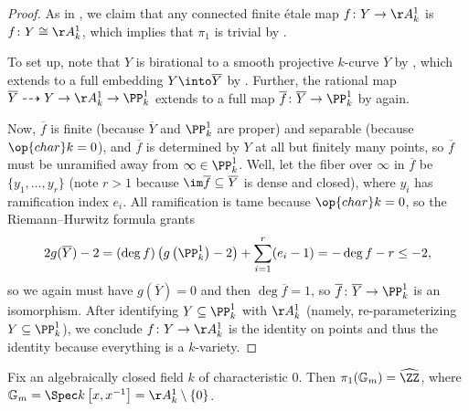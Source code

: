 \documentclass{amsart}
\begin{document}
\begin{proof}
    As in , we claim that any connected finite \'etale map $f\colon Y\to\AA^1_k$ is $f\colon Y\cong\AA^1_k$, which implies that $\pi_1$ is trivial by .

    To set up, note that $Y$ is birational to a smooth projective $k$-curve $\overline Y$ by \cite[Corollary~I.6.11]{hartshorne}, which extends to a full embedding $Y\into\overline Y$ by \cite[Proposition~I.6.8]{hartshorne}. Further, the rational map $\overline Y\dashrightarrow Y\to\AA^1_k\to\PP^1_k$ extends to a full map $\overline f\colon\overline Y\to\PP^1_k$ by \cite[Proposition~I.6.8]{hartshorne} again.

    Now, $\overline f$ is finite (because $\overline Y$ and $\PP^1_k$ are proper) and separable (because $\op{char}k=0$), and $\overline f$ is determined by $Y$ at all but finitely many points, so $\overline f$ must be unramified away from $\infty\in\PP^1_k$. Well, let the fiber over $\infty$ in $\overline f$ be $\{y_1,\ldots,y_r\}$ (note $r>1$ because $\im\overline f\subseteq\overline Y$ is dense and closed), where $y_i$ has ramification index $e_i$. All ramification is tame because $\op{char}k=0$, so the Riemann--Hurwitz formula grants
    \[2g(\overline Y)-2=(\deg f)\left(g\left(\PP^1_k\right)-2\right)+\sum_{i=1}^r(e_i-1)=-\deg f-r\le-2,\]
    so we again must have $g(\overline Y)=0$ and then $\deg\overline f=1$, so $\overline f\colon\overline Y\to\PP^1_k$ is an isomorphism. After identifying $Y\subseteq\PP^1_k$ with $\AA^1_k$ (namely, re-parameterizing $Y\subseteq\PP^1_k$), we conclude $f\colon Y\to\AA^1_k$ is the identity on points and thus the identity because everything is a $k$-variety.
\end{proof}
\begin{example} \label{ex:gm}
    Fix an algebraically closed field $k$ of characteristic $0$. Then $\pi_1(\mathbb G_m)=\widehat\ZZ$, where $\mathbb G_m=\Spec k\left[x,x^{-1}\right]=\AA^1_k\setminus\{0\}$.
\end{example}
\end{document}
